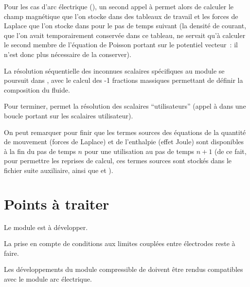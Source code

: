 Pour les cas d'arc \'electrique (), un second appel \`a
 permet alors de calculer le champ magn\'etique
que l'on stocke dans des tableaux de travail et les forces de Laplace que l'on stocke dans
 pour le pas de temps suivant (la densit\'e de
courant, que l'on avait temporairement conserv\'ee dans ce tableau, ne servait
qu'\`a calculer le second membre de l'\'equation de Poisson portant sur le
potentiel vecteur~: il n'est donc plus n\'ecessaire de la conserver).

La r\'esolution s\'equentielle des inconnues scalaires sp\'ecifiques au module se poursuit dans
, avec le calcul des -1 fractions massiques permettant
de d\'efinir la composition du fluide.

Pour terminer,  permet la r\'esolution des scalaires
``utilisateurs'' (appel \`a  dans une boucle portant sur les
 scalaires utilisateur).

On peut remarquer pour finir que les termes sources des \'equations de la quantit\'e de
mouvement (forces de Laplace) et de l'enthalpie (effet Joule) sont disponibles
\`a la fin du pas de temps $n$ pour une utilisation au pas de temps $n+1$ (de ce
fait, pour permettre les reprises de calcul, ces termes sources sont stock\'es dans le fichier suite auxiliaire, ainsi que 
et ).

\newpage
\section*{Points \`a traiter}

 Le module est \`a d\'evelopper.

 La prise en compte de conditions aux
limites coupl\'ees entre \'electrodes reste  \`a faire.

 Les  d\'eveloppements du module
compressible de \CS doivent \^etre rendus compatibles avec le module arc \'electrique.
